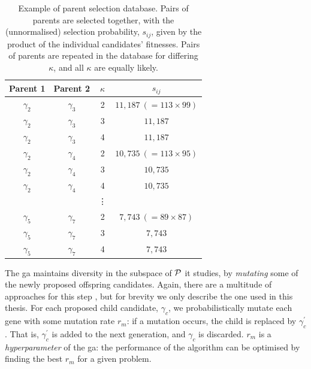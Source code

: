\begin{table}
    \begin{center}
        \begin{tabular}{cccc}
            Parent 1 & Parent 2 & $\kappa$ & $s_{ij}$ \\
            \hline 
            $\gamma_2$ & $\gamma_3$ & 2 & $11,187 \ (=113 \times 99 )$ \\
            $\gamma_2$ & $\gamma_3$ & 3 & $11,187$ \\
            $\gamma_2$ & $\gamma_3$ & 4 & $11,187$ \\

            $\gamma_2$ & $\gamma_4$ & 2 & $10,735 \ (=113 \times 95)$ \\
            $\gamma_2$ & $\gamma_4$ & 3 & $10,735$ \\
            $\gamma_2$ & $\gamma_4$ & 4 & $10,735$ \\

             & & \vdots & \\

            $\gamma_5$ & $\gamma_7$ & 2 & $7,743 \ (=89 \times 87)$ \\
            $\gamma_5$ & $\gamma_7$ & 3 & $7,743$ \\
            $\gamma_5$ & $\gamma_7$ & 4 & $7,743$ \\

        \end{tabular}
    \end{center}
    \caption[Genetic algorithm parent selection database]{
        Example of parent selection database. 
        Pairs of parents are selected together, with the (unnormalised) selection probability, $s_{ij}$, 
        given by the product of the individual candidates' fitnesses. 
        Pairs of parents are repeated in the database for differing $\kappa$, 
            and all $\kappa$ are equally likely. 
    }
    \label{table:selection_database}
\end{table}
    

The \gls{ga} maintains diversity in the subspace of $\mathcal{P}$ it studies, 
    by \emph{mutating} some of the newly proposed offspring candidates. 
Again, there are a multitude of approaches for this step \cite{schmitt2001theory}, 
    but for brevity we only describe the one used in this thesis.
For each proposed child candidate, $\gamma_{c}$, we probabilistically mutate each gene with some mutation rate $r_m$:
    if a mutation occurs, the child is replaced by $\gamma_c^{\prime}$. 
That is, $\gamma_c^{\prime}$  is added to the next generation, and $\gamma_c$ is discarded. 
$r_m$ is a \emph{hyperparameter} of the \gls{ga}:
    the performance of the algorithm can be optimised by finding the best $r_m$ 
    for a given problem. 

